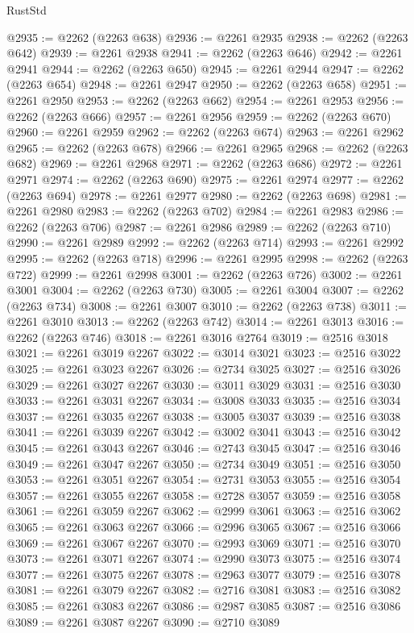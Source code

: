 \begin{lexlean}{RustStd}
\begin{coremodule}
@2935 := @2262 (@2263 @638)
@2936 := @2261 @2935
@2938 := @2262 (@2263 @642)
@2939 := @2261 @2938
@2941 := @2262 (@2263 @646)
@2942 := @2261 @2941
@2944 := @2262 (@2263 @650)
@2945 := @2261 @2944
@2947 := @2262 (@2263 @654)
@2948 := @2261 @2947
@2950 := @2262 (@2263 @658)
@2951 := @2261 @2950
@2953 := @2262 (@2263 @662)
@2954 := @2261 @2953
@2956 := @2262 (@2263 @666)
@2957 := @2261 @2956
@2959 := @2262 (@2263 @670)
@2960 := @2261 @2959
@2962 := @2262 (@2263 @674)
@2963 := @2261 @2962
@2965 := @2262 (@2263 @678)
@2966 := @2261 @2965
@2968 := @2262 (@2263 @682)
@2969 := @2261 @2968
@2971 := @2262 (@2263 @686)
@2972 := @2261 @2971
@2974 := @2262 (@2263 @690)
@2975 := @2261 @2974
@2977 := @2262 (@2263 @694)
@2978 := @2261 @2977
@2980 := @2262 (@2263 @698)
@2981 := @2261 @2980
@2983 := @2262 (@2263 @702)
@2984 := @2261 @2983
@2986 := @2262 (@2263 @706)
@2987 := @2261 @2986
@2989 := @2262 (@2263 @710)
@2990 := @2261 @2989
@2992 := @2262 (@2263 @714)
@2993 := @2261 @2992
@2995 := @2262 (@2263 @718)
@2996 := @2261 @2995
@2998 := @2262 (@2263 @722)
@2999 := @2261 @2998
@3001 := @2262 (@2263 @726)
@3002 := @2261 @3001
@3004 := @2262 (@2263 @730)
@3005 := @2261 @3004
@3007 := @2262 (@2263 @734)
@3008 := @2261 @3007
@3010 := @2262 (@2263 @738)
@3011 := @2261 @3010
@3013 := @2262 (@2263 @742)
@3014 := @2261 @3013
@3016 := @2262 (@2263 @746)
@3018 := @2261 @3016 @2764
@3019 := @2516 @3018
@3021 := @2261 @3019 @2267
@3022 := @3014 @3021
@3023 := @2516 @3022
@3025 := @2261 @3023 @2267
@3026 := @2734 @3025
@3027 := @2516 @3026
@3029 := @2261 @3027 @2267
@3030 := @3011 @3029
@3031 := @2516 @3030
@3033 := @2261 @3031 @2267
@3034 := @3008 @3033
@3035 := @2516 @3034
@3037 := @2261 @3035 @2267
@3038 := @3005 @3037
@3039 := @2516 @3038
@3041 := @2261 @3039 @2267
@3042 := @3002 @3041
@3043 := @2516 @3042
@3045 := @2261 @3043 @2267
@3046 := @2743 @3045
@3047 := @2516 @3046
@3049 := @2261 @3047 @2267
@3050 := @2734 @3049
@3051 := @2516 @3050
@3053 := @2261 @3051 @2267
@3054 := @2731 @3053
@3055 := @2516 @3054
@3057 := @2261 @3055 @2267
@3058 := @2728 @3057
@3059 := @2516 @3058
@3061 := @2261 @3059 @2267
@3062 := @2999 @3061
@3063 := @2516 @3062
@3065 := @2261 @3063 @2267
@3066 := @2996 @3065
@3067 := @2516 @3066
@3069 := @2261 @3067 @2267
@3070 := @2993 @3069
@3071 := @2516 @3070
@3073 := @2261 @3071 @2267
@3074 := @2990 @3073
@3075 := @2516 @3074
@3077 := @2261 @3075 @2267
@3078 := @2963 @3077
@3079 := @2516 @3078
@3081 := @2261 @3079 @2267
@3082 := @2716 @3081
@3083 := @2516 @3082
@3085 := @2261 @3083 @2267
@3086 := @2987 @3085
@3087 := @2516 @3086
@3089 := @2261 @3087 @2267
@3090 := @2710 @3089

\end{coremodule}
\end{lexlean}
